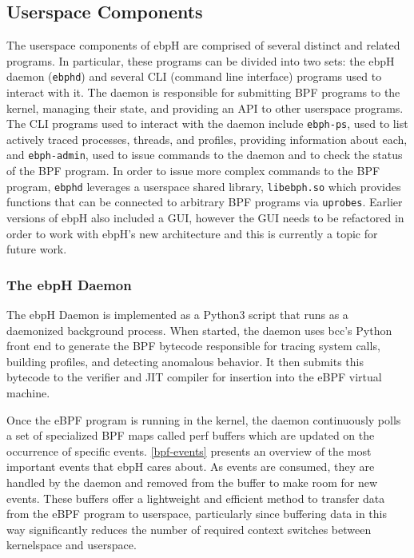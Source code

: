 \documentclass[
  12pt]{findlay}
\newcommand{\passthrough}[1]{#1}
\begin{document}
\FloatBarrier

\hypertarget{userspace-components}{%
\subsection{Userspace Components}\label{userspace-components}}

The userspace components of ebpH are comprised of several distinct and
related programs. In particular, these programs can be divided into two
sets: the ebpH daemon (\passthrough{\lstinline!ebphd!}) and several CLI
(command line interface) programs used to interact with it. The daemon
is responsible for submitting BPF programs to the kernel, managing their
state, and providing an API to other userspace programs. The CLI
programs used to interact with the daemon include
\passthrough{\lstinline!ebph-ps!}, used to list actively traced
processes, threads, and profiles, providing information about each, and
\passthrough{\lstinline!ebph-admin!}, used to issue commands to the
daemon and to check the status of the BPF program. In order to issue
more complex commands to the BPF program,
\passthrough{\lstinline!ebphd!} leverages a userspace shared library,
\passthrough{\lstinline!libebph.so!} which provides functions that can
be connected to arbitrary BPF programs via
\passthrough{\lstinline!uprobes!}. Earlier versions of ebpH also
included a GUI, however the GUI needs to be refactored in order to work
with ebpH's new architecture and this is currently a topic for future
work.

\hypertarget{the-ebph-daemon}{%
\subsubsection{The ebpH Daemon}\label{the-ebph-daemon}}

The ebpH Daemon is implemented as a Python3 script that runs as a
daemonized background process. When started, the daemon uses bcc's
Python front end \autocite{bcc} to generate the BPF bytecode responsible
for tracing system calls, building profiles, and detecting anomalous
behavior. It then submits this bytecode to the verifier and JIT compiler
for insertion into the eBPF virtual machine.

Once the eBPF program is running in the kernel, the daemon continuously
polls a set of specialized BPF maps called perf buffers which are
updated on the occurrence of specific events. \autoref{bpf-events}
presents an overview of the most important events that ebpH cares about.
As events are consumed, they are handled by the daemon and removed from
the buffer to make room for new events. These buffers offer a
lightweight and efficient method to transfer data from the eBPF program
to userspace, particularly since buffering data in this way
significantly reduces the number of required context switches between
kernelspace and userspace.
\end{document}
